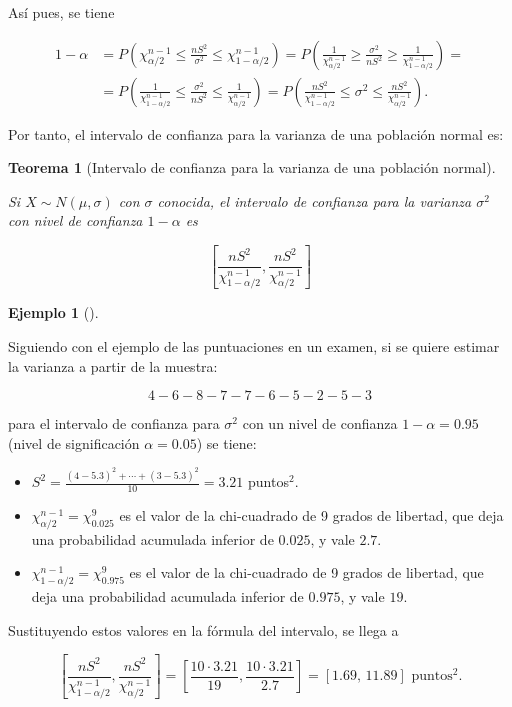 \documentclass[
  spanish,
  a4paper,
]{scrreport}
\providecommand{\tightlist}{%
  \setlength{\itemsep}{0pt}\setlength{\parskip}{0pt}}
\theoremstyle{plain}
\newtheorem{theorem}{Teorema}[chapter]
\theoremstyle{definition}
\newtheorem{example}{Ejemplo}[chapter]
\theoremstyle{definition}
\theoremstyle{remark}
\begin{document}
Así pues, se tiene

\begin{align*}
1-\alpha &= P\left(\chi^{n-1}_{\alpha/2}\leq \frac{nS^2}{\sigma^2}  \leq \chi^{n-1}_{1-\alpha/2}\right) =
P\left(\frac{1}{\chi^{n-1}_{\alpha/2}}\geq \frac{\sigma^2}{nS^2}  \geq \frac{1}{\chi^{n-1}_{1-\alpha/2}}\right)=\\
&= P\left(\frac{1}{\chi^{n-1}_{1-\alpha/2}}\leq \frac{\sigma^2}{nS^2}  \leq \frac{1}{\chi^{n-1}_{\alpha/2}}\right)
= P\left(\frac{nS^2}{\chi^{n-1}_{1-\alpha/2}}\leq \sigma^2  \leq \frac{nS^2}{\chi^{n-1}_{\alpha/2}}\right).
\end{align*}

Por tanto, el intervalo de confianza para la varianza de una población
normal es:

\begin{theorem}[Intervalo de confianza para la varianza de una población
normal]\protect\hypertarget{thm-intervalo-confianza-varianza-normal}{}\label{thm-intervalo-confianza-varianza-normal}

Si \(X\sim N(\mu, \sigma)\) con \(\sigma\) conocida, el \emph{intervalo
de confianza para la varianza} \(\sigma^2\) con nivel de confianza
\(1-\alpha\) es

\[
\left[\frac{nS^2}{\chi^{n-1}_{1-\alpha/2}},\frac{nS^2}{\chi^{n-1}_{\alpha/2}}\right]
\]

\end{theorem}

\begin{example}[]\protect\hypertarget{exm-intervalo-confianza-varianza-normal}{}\label{exm-intervalo-confianza-varianza-normal}

Siguiendo con el ejemplo de las puntuaciones en un examen, si se quiere
estimar la varianza a partir de la muestra:

\[
4 - 6 - 8 - 7 - 7 - 6 - 5 - 2 - 5 - 3
\]

para el intervalo de confianza para \(\sigma^2\) con un nivel de
confianza \(1-\alpha=0.95\) (nivel de significación \(\alpha=0.05\)) se
tiene:

\begin{itemize}
\tightlist
\item
  \(S^2= \frac{(4-5.3)^2+\cdots+(3-5.3)^2}{10} = 3.21\) puntos\(^2\).
\item
  \(\chi^{n-1}_{\alpha/2}=\chi^9_{0.025}\) es el valor de la
  chi-cuadrado de 9 grados de libertad, que deja una probabilidad
  acumulada inferior de \(0.025\), y vale \(2.7\).
\item
  \(\chi^{n-1}_{1-\alpha/2}=\chi^9_{0.975}\) es el valor de la
  chi-cuadrado de 9 grados de libertad, que deja una probabilidad
  acumulada inferior de \(0.975\), y vale \(19\).
\end{itemize}

Sustituyendo estos valores en la fórmula del intervalo, se llega a

\[
\left[\frac{nS^2}{\chi^{n-1}_{1-\alpha/2}},\frac{nS^2}{\chi^{n-1}_{\alpha/2}}\right] =
\left[\frac{10\cdot 3.21}{19},\frac{10\cdot 3.21}{2.7}\right] = [1.69,\,11.89] \text{ puntos}^2.
\]

\end{example}
\end{document}
